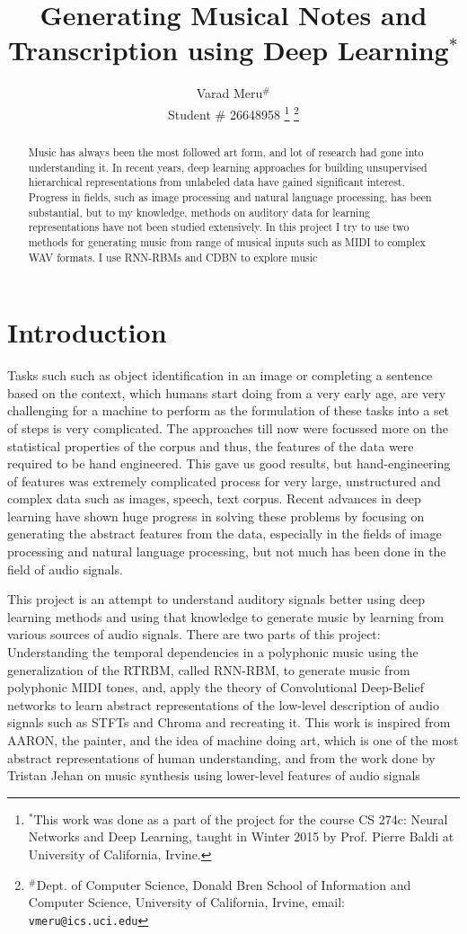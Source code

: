 \documentclass[letterpaper, 10 pt, conference]{ieeeconf}
\title{\LARGE \bf
Generating Musical Notes and Transcription using Deep Learning$^{*}$}
\author{Varad Meru$^{\#}$%
\\ {\small Student \# 26648958}
\thanks{$^{*}$This work was done as a part of the project for the course CS 274c: Neural Networks and Deep Learning, taught in Winter 2015 by Prof. Pierre Baldi at University of California, Irvine.}%
\thanks{$^{\#}$Dept. of Computer Science, Donald Bren School of Information and Computer Science, University of California, Irvine, email: {\tt\small vmeru@ics.uci.edu}}%
}
\begin{document}
\maketitle
\thispagestyle{empty}
\pagestyle{empty}

\begin{abstract}
Music has always been the most followed art form, and lot of research had gone into understanding it. In recent years, deep learning approaches for building unsupervised hierarchical representations from unlabeled data have gained significant interest. Progress in fields, such as image processing and natural language processing, has been substantial, but to my knowledge, methods on auditory data for learning representations have not been studied extensively. In this project I try to use two methods for generating music from range of musical inputs such as MIDI to complex WAV formats. I use RNN-RBMs and CDBN to explore music 
\end{abstract}
\section{Introduction}

Tasks such such as object identification in an image or completing a sentence based on the context, which humans start doing from a very early age, are very challenging for a machine to perform as the formulation of these tasks into a set of steps is very complicated. The approaches till now were focussed more on the statistical properties of the corpus and thus, the features of the data were required to be hand engineered. This gave us good results, but hand-engineering of features was extremely complicated process for very large, unstructured and complex data such as images, speech, text corpus. Recent advances in deep learning have shown huge progress in solving these problems by focusing on generating the abstract features from the data, especially in the fields of image processing and natural language processing, but not much has been done in the field of audio signals. 

This project is an attempt to understand auditory signals better using deep learning methods and using that knowledge to generate music by learning from various sources of audio signals. There are two parts of this project: Understanding the temporal dependencies in a polyphonic music using the generalization of the RTRBM, called RNN-RBM\cite{c8}, to generate music from polyphonic MIDI tones, and, apply the theory of Convolutional Deep-Belief networks\cite{c1} to learn abstract representations of the low-level description of audio signals such as STFTs and Chroma and recreating it. This work is inspired from AARON, the painter,\cite{c5} and the idea of machine doing art, which is one of the most abstract representations of human understanding, and from the work done by Tristan Jehan\cite{c4} on music synthesis using lower-level features of audio signals
\end{document}
